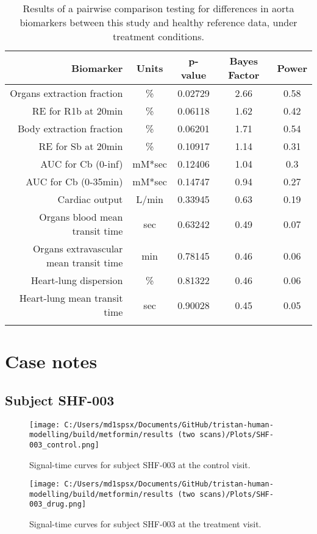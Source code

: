 \documentclass{epflreport}%
\begin{document}
\begin{longtable}{rcccc}%
\hline%
Biomarker&Units&p{-}value&Bayes Factor&Power\\%
\hline%
Organs extraction fraction&\%&0.02729&2.66&0.58\\%
RE for R1b at 20min&\%&0.06118&1.62&0.42\\%
Body extraction fraction&\%&0.06201&1.71&0.54\\%
RE for Sb at 20min&\%&0.10917&1.14&0.31\\%
AUC for Cb (0{-}inf)&mM*sec&0.12406&1.04&0.3\\%
AUC for Cb (0{-}35min)&mM*sec&0.14747&0.94&0.27\\%
Cardiac output&L/min&0.33945&0.63&0.19\\%
Organs blood mean transit time&sec&0.63242&0.49&0.07\\%
Organs extravascular mean transit time&min&0.78145&0.46&0.06\\%
Heart{-}lung dispersion&\%&0.81322&0.46&0.06\\%
Heart{-}lung mean transit time&sec&0.90028&0.45&0.05\\%
\hline%
\caption{Results of a pairwise comparison testing for differences in aorta biomarkers between this study and healthy reference data, under treatment conditions.} \\%
\end{longtable}%
\clearpage%
\section{Case notes}%
\label{sec:Casenotes}%

%
\subsection{Subject SHF{-}003}%
\label{subsec:SubjectSHF{-}003}%

%


\begin{figure}[h!]%
\centering%
\texttt{[image: C:/Users/md1spsx/Documents/GitHub/tristan-human-modelling/build/metformin/results (two scans)/Plots/SHF-003\_control.png]}%
\caption{Signal{-}time curves for subject SHF{-}003 at the control visit.}%
\end{figure}

%


\begin{figure}[h!]%
\centering%
\texttt{[image: C:/Users/md1spsx/Documents/GitHub/tristan-human-modelling/build/metformin/results (two scans)/Plots/SHF-003\_drug.png]}%
\caption{Signal{-}time curves for subject SHF{-}003 at the treatment visit.}%
\end{figure}
\end{document}
